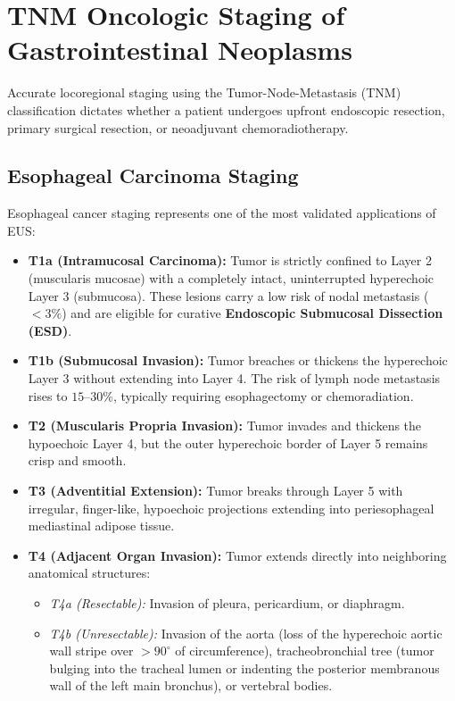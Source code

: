 \documentclass[11pt,a4paper]{article}
\begin{document}
\section{TNM Oncologic Staging of Gastrointestinal Neoplasms}
Accurate locoregional staging using the Tumor-Node-Metastasis (TNM) classification dictates whether a patient undergoes upfront endoscopic resection, primary surgical resection, or neoadjuvant chemoradiotherapy.

\subsection{Esophageal Carcinoma Staging}
Esophageal cancer staging represents one of the most validated applications of EUS:
\begin{itemize}[leftmargin=2em]
    \item \textbf{T1a (Intramucosal Carcinoma):} Tumor is strictly confined to Layer 2 (muscularis mucosae) with a completely intact, uninterrupted hyperechoic Layer 3 (submucosa). These lesions carry a low risk of nodal metastasis ($< 3\%$) and are eligible for curative \textbf{Endoscopic Submucosal Dissection (ESD)}.
    \item \textbf{T1b (Submucosal Invasion):} Tumor breaches or thickens the hyperechoic Layer 3 without extending into Layer 4. The risk of lymph node metastasis rises to $15\text{--}30\%$, typically requiring esophagectomy or chemoradiation.
    \item \textbf{T2 (Muscularis Propria Invasion):} Tumor invades and thickens the hypoechoic Layer 4, but the outer hyperechoic border of Layer 5 remains crisp and smooth.
    \item \textbf{T3 (Adventitial Extension):} Tumor breaks through Layer 5 with irregular, finger-like, hypoechoic projections extending into periesophageal mediastinal adipose tissue.
    \item \textbf{T4 (Adjacent Organ Invasion):} Tumor extends directly into neighboring anatomical structures:
    \begin{itemize}
        \item \textit{T4a (Resectable):} Invasion of pleura, pericardium, or diaphragm.
        \item \textit{T4b (Unresectable):} Invasion of the aorta (loss of the hyperechoic aortic wall stripe over $> 90^\circ$ of circumference), tracheobronchial tree (tumor bulging into the tracheal lumen or indenting the posterior membranous wall of the left main bronchus), or vertebral bodies.
    \end{itemize}
\end{itemize}
\end{document}
